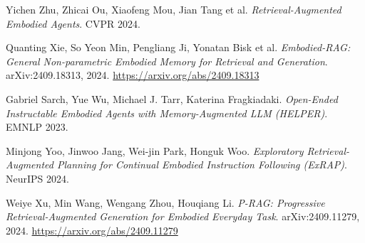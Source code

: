 \documentclass[12pt]{report}
\begin{document}
\begin{thebibliography}{99}
  \raggedright

  Yichen Zhu, Zhicai Ou, Xiaofeng Mou, Jian Tang et al.
  \textit{Retrieval-Augmented Embodied Agents}.
  CVPR 2024.

  Quanting Xie, So Yeon Min, Pengliang Ji, Yonatan Bisk et al.
  \textit{Embodied-RAG: General Non-parametric Embodied Memory for Retrieval and Generation}.
  arXiv:2409.18313, 2024. \url{https://arxiv.org/abs/2409.18313}

  Gabriel Sarch, Yue Wu, Michael J. Tarr, Katerina Fragkiadaki.
  \textit{Open-Ended Instructable Embodied Agents with Memory-Augmented LLM (HELPER)}.
  EMNLP 2023.

  Minjong Yoo, Jinwoo Jang, Wei-jin Park, Honguk Woo.
  \textit{Exploratory Retrieval-Augmented Planning for Continual Embodied Instruction Following (ExRAP)}.
  NeurIPS 2024.

  Weiye Xu, Min Wang, Wengang Zhou, Houqiang Li.
  \textit{P-RAG: Progressive Retrieval-Augmented Generation for Embodied Everyday Task}.
  arXiv:2409.11279, 2024. \url{https://arxiv.org/abs/2409.11279}

\end{thebibliography}
\end{document}
